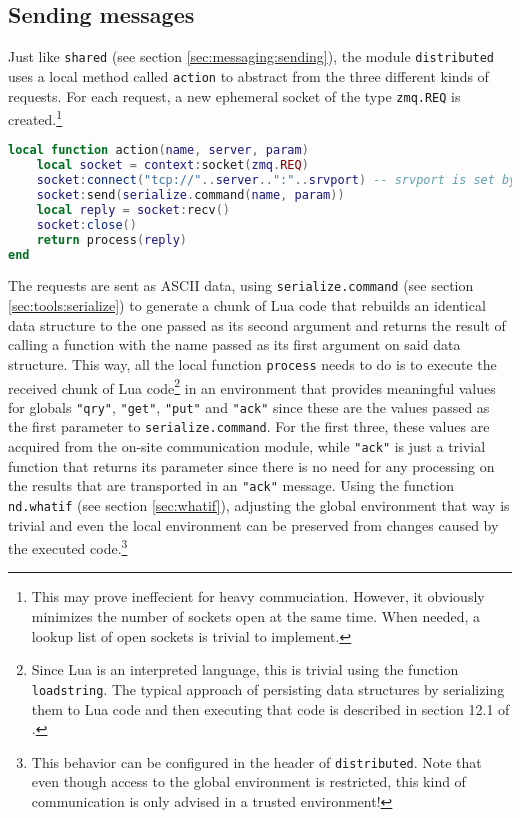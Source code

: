 \subsection{Sending messages}

Just like \texttt{shared} (see section \ref{sec:messaging:sending}), the module \texttt{distributed} uses a local method called \texttt{action} to abstract from the three different kinds of requests. For each request, a new ephemeral socket of the type \texttt{zmq.REQ} is created.\footnote{This may prove ineffecient for heavy commuciation. However, it obviously minimizes the number of sockets open at the same time. When needed, a lookup list of open sockets is trivial to implement.}

\begin{lstlisting}[language=lua, caption={The local function \texttt{action} of the module \texttt{distributed}}, label=lst:distributedaction, name=lst:distributedaction]
local function action(name, server, param)
	local socket = context:socket(zmq.REQ)
	socket:connect("tcp://"..server..":"..srvport) -- srvport is set by distributed.init
	socket:send(serialize.command(name, param))
	local reply = socket:recv()
	socket:close()
	return process(reply)
end
\end{lstlisting}

The requests are sent as ASCII data, using \texttt{serialize.command} (see section \ref{sec:tools:serialize}) to generate a chunk of Lua code that rebuilds an identical data structure to the one passed as its second argument and returns the result of calling a function with the name passed as its first argument on said data structure. This way, all the local function \texttt{process} needs to do is to execute the received chunk of Lua code\footnote{Since Lua is an interpreted language, this is trivial using the function \texttt{loadstring}. The typical approach of persisting data structures by serializing them to Lua code and then executing that code is described in section 12.1 of \cite{Ierusalimschy2006}.} in an environment that provides meaningful values for globals \texttt{"qry"}, \texttt{"get"}, \texttt{"put"} and \texttt{"ack"} since these are the values passed as the first parameter to \texttt{serialize.command}. For the first three, these values are acquired from the on-site communication module, while \texttt{"ack"} is just a trivial function that returns its parameter since there is no need for any processing on the results that are transported in an \texttt{"ack"} message. Using the function \texttt{nd.whatif} (see section \ref{sec:whatif}), adjusting the global environment that way is trivial and even the local environment can be preserved from changes caused by the executed code.\footnote{This behavior can be configured in the header of \texttt{distributed}. Note that even though access to the global environment is restricted, this kind of communication is only advised in a trusted environment!}

